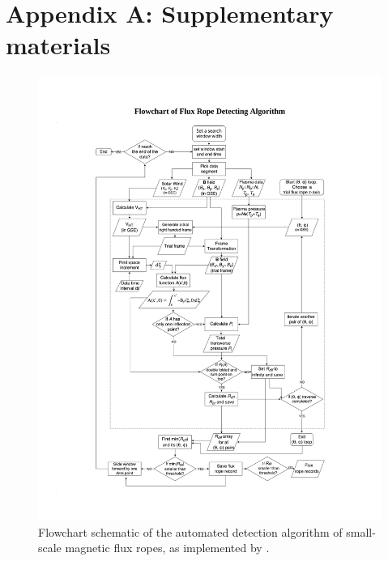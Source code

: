 \chapter{Appendix A: Supplementary materials}\label{ch:gs-flowchart}

\renewcommand{\thechapter}{A} 




\begin{figure}
    \centering
    \includegraphics[width=\linewidth]{Figures/Flowchart of Flux Rope Detecting Algorithm.pdf}
    \caption[Flowchart of GS-reconstruction based automated detection algorithm]{Flowchart schematic of the automated detection algorithm of small-scale magnetic flux ropes, as implemented by \cite{Hu:2018, Zheng:2018}.}
    \label{fig:flowchart}
\end{figure}